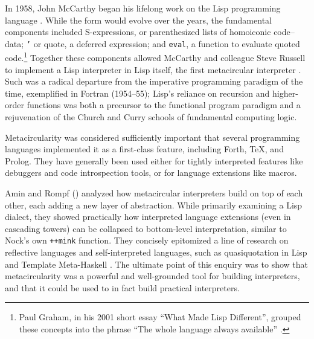 \documentclass[twoside]{article}
\begin{document}
In 1958, John McCarthy began his lifelong work on the Lisp programming language \citep{McCarthy1996}.  While the form would evolve over the years, the fundamental components included S-expressions, or parenthesized lists of homoiconic code–data; \texttt{'} or quote, a deferred expression; and \texttt{eval}, a function to evaluate quoted code.\footnote{Paul Graham, in his 2001 short essay ``What Made Lisp Different'', grouped these concepts into the phrase ``The whole language always available'' \citep{Graham2001}.}  Together these components allowed McCarthy and colleague Steve Russell to implement a Lisp interpreter in Lisp itself, the first metacircular interpreter \citep{McCarthy1978}.  Such was a radical departure from the imperative programming paradigm of the time, exemplified in Fortran (1954–55); Lisp's reliance on recursion and higher-order functions was both a precursor to the functional program paradigm and a rejuvenation of the Church and Curry schools of fundamental computing logic.

Metacircularity was considered sufficiently important that several programming languages implemented it as a first-class feature, including Forth, TeX, and Prolog.  They have generally been used either for tightly interpreted features like debuggers and code introspection tools, or for language extensions like macros.

Amin and Rompf (\citeyear{Amin2017}) analyzed how metacircular interpreters build on top of each other, each adding a new layer of abstraction.  While primarily examining a Lisp dialect, they showed practically how interpreted language extensions (even in cascading towers) can be collapsed to bottom-level interpretation, similar to Nock's own \lstinline[style=inlinecode]{++mink} function.  They concisely epitomized a line of research on reflective languages and self-interpreted languages, such as quasiquotation in Lisp \citep{Bawden1999} and Template Meta-Haskell \citep{Sheard2002}.  The ultimate point of this enquiry was to show that metacircularity was a powerful and well-grounded tool for building interpreters, and that it could be used to in fact build practical interpreters.
\end{document}
